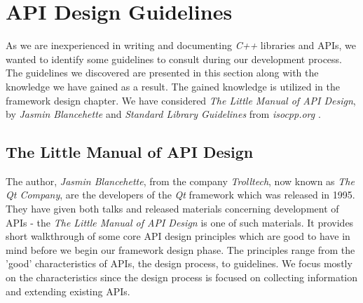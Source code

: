\section{API Design Guidelines}
As we are inexperienced in writing and documenting \textit{C++} libraries and APIs, we wanted to identify some guidelines to consult during our development process. The guidelines we discovered are presented in this section along with the knowledge we have gained as a result. The gained knowledge is utilized in the framework design chapter. 
We have considered \textit{The Little Manual of API Design}, by \textit{Jasmin Blancehette} \cite{apiDesignManual} and \textit{Standard Library Guidelines} from \textit{isocpp.org} \cite{isoLibDesign}.

\subsection{The Little Manual of API Design}
The author, \textit{Jasmin Blancehette}, from the company \textit{Trolltech}, now known as \textit{The Qt Company}, are the developers of the \textit{Qt} framework which was released in 1995. They have given both talks and released materials concerning development of APIs - the \textit{The Little Manual of API Design} is one of such materials. It provides short walkthrough of some core API design principles which are good to have in mind before we begin our framework design phase. The principles range from the 'good' characteristics of APIs, the design process, to guidelines. We focus mostly on the characteristics since the design process is focused on collecting information and extending existing APIs.

